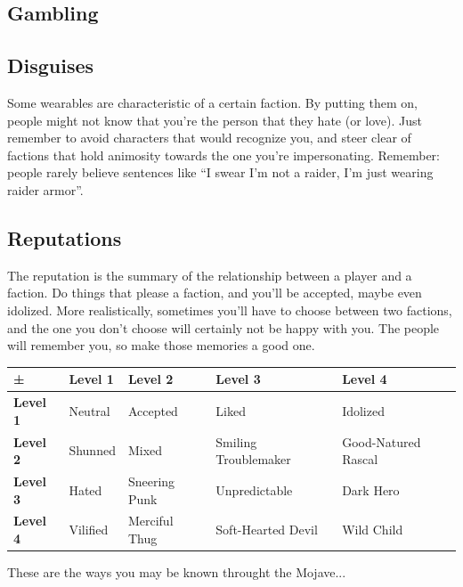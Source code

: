 \documentclass[11pt]{article} %
\begin{document}
\subsection{Gambling}

\subsection{Disguises}

Some wearables are characteristic of a certain faction. By putting them on, people might not know that you're the person that they hate (or love). Just remember to avoid characters that would recognize you, and steer clear of factions that hold animosity towards the one you're impersonating. Remember: people rarely believe sentences like ``I swear I'm not a raider, I'm just wearing raider armor''.


\subsection{Reputations} 

The reputation is the summary of the relationship between a player and a faction. Do things that please a faction, and you'll be accepted, maybe even idolized. More realistically, sometimes you'll have to choose between two factions, and the one you don't choose will certainly not be happy with you. The people will remember you, so make those memories a good one.

\begin{longtable}{|p{2.3cm}|p{2.3cm}|p{2.3cm}|p{2.3cm}|p{2.3cm}|}
\hline
\textbf{±}  & \textbf{Level 1} & \textbf{Level 2} & \textbf{Level 3} & \textbf{Level 4} \\
\hline
\endhead
\textbf{Level 1} & Neutral & Accepted & Liked & Idolized \\
\hline
\textbf{Level 2} & Shunned & Mixed & Smiling Troublemaker & Good-Natured Rascal \\
\hline
\textbf{Level 3} & Hated & Sneering Punk & Unpredictable & Dark Hero \\
\hline
\textbf{Level 4} & Vilified & Merciful Thug & Soft-Hearted Devil & Wild Child \\
\hline
\end{longtable}{These are the ways you may be known throught the Mojave...}
\end{document}
